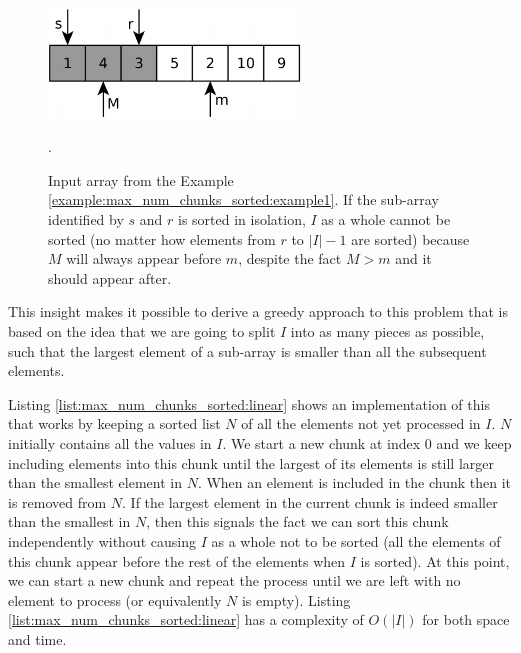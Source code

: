 \begin{figure}
  \centering
   \includegraphics[width=0.6\textwidth]{sources/max_num_chunks_sorted/images/example1}
   \caption[]{Input array from the Example \ref{example:max_num_chunks_sorted:example1}. If the 
   sub-array identified by $s$ and $r$ is sorted in isolation, $I$ as a whole cannot be sorted (no matter how elements from $r$ to $|I|-1$ are sorted)
   because $M$ will always appear before $m$, despite the fact $M>m$ and it should appear after.}.
   \label{fig:max_num_chunks_sorted:example1}
\end{figure}

This insight makes it possible to derive a greedy approach to this problem that is based on the idea that we 
are going to split $I$ into as many pieces as possible, such that the largest element of a sub-array 
is smaller than all the subsequent elements. 

Listing \ref{list:max_num_chunks_sorted:linear} shows an implementation of this that works by keeping a sorted list $N$
of all the elements not yet processed in $I$. $N$ initially contains all the values in $I$.
We start a new chunk at index $0$ and we keep including elements into this chunk until the largest
of its elements is still larger than the smallest element in $N$.
When an element is included in the chunk then it is removed from $N$.
If the largest element in the current chunk is indeed smaller than the smallest in $N$,
then this signals the fact we can sort this chunk independently without
causing $I$ as a whole not to be sorted (all the elements of this chunk appear before the rest of the elements when $I$ is sorted).
At this point, we can start a new chunk and repeat the process until
we are left with no element to process (or equivalently $N$ is empty).
Listing \ref{list:max_num_chunks_sorted:linear} has a complexity of $O(|I|)$ for both space and time. 

